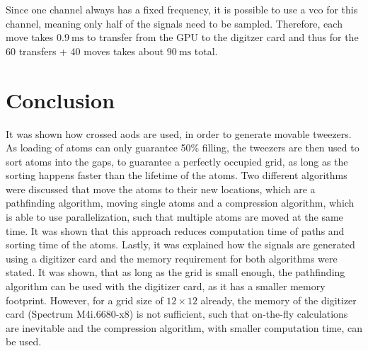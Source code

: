 Since one channel always has a fixed frequency, it is possible to use a \ac{vco} for this channel, meaning only half of the signals need to be sampled. Therefore, each move takes $\SI{0.9}{\milli\second}$ to transfer from the GPU to the digitzer card and thus for the 60 transfers + 40 moves takes about $\SI{90}{\milli\second}$ total.

\section{Conclusion}

It was shown how crossed \acp{aod} are used, in order to generate movable tweezers. As loading of atoms can only guarantee 50\% filling, the tweezers are then used to sort atoms into the gaps, to guarantee a perfectly occupied grid, as long as the sorting happens faster than the lifetime of the atoms. Two different algorithms were discussed that move the atoms to their new locations, which are a pathfinding algorithm, moving single atoms and a compression algorithm, which is able to use parallelization, such that multiple atoms are moved at the same time. It was shown that this approach reduces computation time of paths and sorting time of the atoms. Lastly, it was explained how the signals are generated using a digitizer card and the memory requirement for both algorithms were stated. It was shown, that as long as the grid is small enough, the pathfinding algorithm can be used with the digitizer card, as it has a smaller memory footprint. However, for a grid size of $12\times12$ already, the memory of the digitizer card (Spectrum M4i.6680-x8) is not sufficient, such that on-the-fly calculations are inevitable and the compression algorithm, with smaller computation time, can be used.
